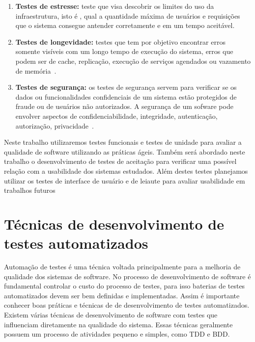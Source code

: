 \begin{enumerate}
\item \textbf{Testes de estresse:} teste que visa descobrir os limites do uso da 
infraestrutura, isto é , qual a quantidade máxima de usuários e requisições que o 
sistema consegue antender corretamente e em um tempo aceitável.

\item \textbf{Testes de longevidade:} testes que tem por objetivo encontrar erros 
somente visíveis com um longo tempo de execução do sistema, erros que podem ser de cache, replicação, execução de serviços agendados ou vazamento de memória~\cite{bernardo2011}.

\item \textbf{Testes de segurança:} os testes de segurança servem para verificar se 
os dados ou funcionalidades confidenciais de um sistema  estão protegidos de fraude 
ou de usuários não autorizados. A segurança de um sofware pode envolver aspectos de 
confidenciabilidade, integridade, autenticação, autorização, privacidade~\cite{whittaker2006}.

\end{enumerate}

Neste trabalho utilizaremos testes funcionais e testes de unidade para avaliar a qualidade de software utilizando as práticas ágeis. Também será abordado neste trabalho o desenvolvimento de testes de aceitação para verificar uma possível relação com a usabilidade dos sistemas estudados. Além destes testes planejamos utilizar os testes de interface de usuário e de leiaute para avaliar usabilidade em trabalhos futuros


\section{Técnicas de desenvolvimento de testes automatizados}

Automação de testes é uma técnica voltada principalmente para a melhoria de 
qualidade dos sistemas de software. 
%
No processo de desenvolvimento de software é fundamental controlar o custo do 
processo de testes, para isso baterias de testes automatizados devem ser bem 
definidas e implementadas. Assim é importante conhecer boas práticas e técnicas 
de de desenvolvimento de testes automatizados.    
%
Existem várias técnicas de desenvolvimento de software com testes que influenciam 
diretamente na qualidade do sistema. Essas técnicas geralmente possuem um processo 
de atividades pequeno e simples, como TDD e BDD.

